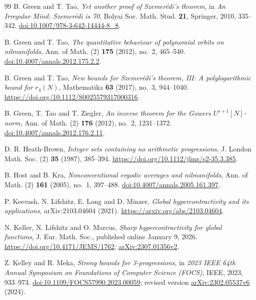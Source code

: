 \begin{thebibliography}{99}
B. Green and T. Tao, \emph{Yet another proof of Szemer\'edi's theorem},
in \emph{An Irregular Mind: Szemer\'edi is 70},
Bolyai Soc. Math. Stud. \textbf{21}, Springer, 2010, 335--342.
\href{https://doi.org/10.1007/978-3-642-14444-8_8}{doi:10.1007/978-3-642-14444-8\_8}.

B. Green and T. Tao, \emph{The quantitative behaviour of polynomial
orbits on nilmanifolds},
Ann. of Math. (2) \textbf{175} (2012), no.~2, 465--540.
\href{https://doi.org/10.4007/annals.2012.175.2.2}{doi:10.4007/annals.2012.175.2.2}.

B. Green and T. Tao, \emph{New bounds for Szemer\'edi's theorem, III:
A polylogarithmic bound for $r_4(N)$}, Mathematika \textbf{63} (2017),
no.~3, 944--1040. \url{https://doi.org/10.1112/S0025579317000316}.

B. Green, T. Tao and T. Ziegler,
\emph{An inverse theorem for the Gowers $U^{s+1}[N]$-norm},
Ann. of Math. (2) \textbf{176} (2012), no.~2, 1231--1372.
\href{https://doi.org/10.4007/annals.2012.176.2.11}{doi:10.4007/annals.2012.176.2.11}.

D. R. Heath-Brown, \emph{Integer sets containing no arithmetic progressions},
J. London Math. Soc. (2) \textbf{35} (1987), 385--394.
\url{https://doi.org/10.1112/jlms/s2-35.3.385}.

B. Host and B. Kra, \emph{Nonconventional ergodic averages and nilmanifolds},
Ann. of Math. (2) \textbf{161} (2005), no.~1, 397--488.
\href{https://doi.org/10.4007/annals.2005.161.397}{doi:10.4007/annals.2005.161.397}.

P. Keevash, N. Lifshitz, E. Long and D. Minzer,
\emph{Global hypercontractivity and its applications},
arXiv:2103.04604 (2021).
\url{https://arxiv.org/abs/2103.04604}.

N. Keller, N. Lifshitz and O. Marcus, \emph{Sharp hypercontractivity for
global functions}, J. Eur. Math. Soc., published online January 9, 2026.
\url{https://doi.org/10.4171/JEMS/1762};
\href{https://arxiv.org/abs/2307.01356v2}{arXiv:2307.01356v2}.

Z. Kelley and R. Meka, \emph{Strong bounds for 3-progressions},
in \emph{2023 IEEE 64th Annual Symposium on Foundations of Computer Science (FOCS)},
IEEE, 2023, 933--973.
\href{https://doi.org/10.1109/FOCS57990.2023.00059}{doi:10.1109/FOCS57990.2023.00059};
revised version \href{https://arxiv.org/abs/2302.05537v6}{arXiv:2302.05537v6} (2024).


\end{thebibliography}

